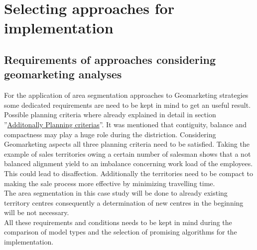 \section{Selecting approaches for implementation}\label{Selecting}
\subsection{Requirements of approaches considering geomarketing \newline  analyses}

For the application of area segmentation approaches to Geomarketing strategies some dedicated requirements are need to be kept in mind to get an useful result. Possible planning criteria where already explained in detail in section \label{criterias} ''\hyperref[criterias]{Additonally Planning criterias}''. It was mentioned that contiguity, balance and compactness may play a huge role during the distriction. Considering Geomarketing aspects all three planning criteria need to be satisfied. Taking the example of sales territories owing a certain number of salesman shows that a not balanced alignment yield to an imbalance concerning work load of the employees. This could lead to disaffection. Additionally the territories need to be compact to making the sale process more effective by minimizing travelling time. \\
The area segmentation in this case study will be done to already existing territory centres consequently a determination of new centres in the beginning will be not necessary. \\
All these requirements and conditions needs to be kept in mind during the comparison of model types and the selection of promising algorithms for the implementation.



